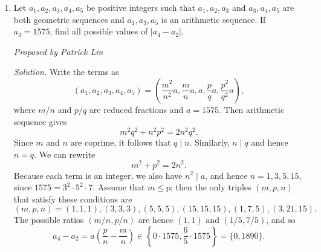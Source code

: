 \documentclass[10pt]{article}
\newcommand{\proposed}[1]
{
\vspace{5pt}
\noindent\textit{Proposed by #1}
}
\newcommand{\solution}
{
\vspace{5pt}
\noindent\textit{Solution.}\qquad
}
\begin{document}
\begin{enumerate}
	\proposed{David Altizio}
	
	\solution Note that since the sum of the three multiplicands is $(a+b)+(b+c)+(c+a) = 2(a+b+c)$, we know that at least one of $a+b$, $b+c$, or $c+a$ is even.  Thus the product is always divisible by $2$.  In order for the product to not be divisible by $4$, it must be the case that two of these quantities are odd and the third one is congruent to $2$ modulo $4$.

\par WLOG suppose that $a+b$ and $a+c$ are odd and $b+c\equiv 2\pmod 4$.  Since $(a+b)-(a+c) = b-c$ is even, it follows that $b$ and $c$ are of the same parity.  We now split into cases based on whether both are even or both are odd.

\begin{itemize}

\item If both are even, then they cannot both be congruent modulo $4$, or else their sum would be divisible by $4$.  It follows that $b$ and $c$ must be $4$ and $2$ in some order.  Then $a$ can be $1$, $3$, or $5$; this gives a total of $2\times 3 = 6$ possibilities in this case.

\item If both are odd, then they both must be congruent modulo $4$, or else their sum would be $1+3\equiv 0\pmod 4$.  This means they must be both either $1\pmod 4$ or $3\pmod 4$.  Then $a$ can be either $2$ or $4$, so there are a total of $2\times (2^2+1) = 10$ possibilities in this case.

\end{itemize}

Multiplying by $3$ from our WLOG above gives the final answer as $3(6+10) = \boxed{48}$.

\item Let $a_1, a_2, a_3, a_4, a_5$ be positive integers such that $a_1, a_2, a_3$ and $a_3, a_4, a_5$ are both geometric sequences and $a_1, a_3, a_5$ is an arithmetic sequence. If $a_3 = 1575$, find all possible values of $\vert a_4 - a_2 \vert$.

\proposed{Patrick Lin}

\solution Write the terms as
\[(a_1, a_2, a_3, a_4, a_5) = \left(\frac{m^2}{n^2}a, \frac{m}{n}a, a, \frac{p}{q}a, \frac{p^2}{q^2}a\right),\]
where $m/n$ and $p/q$ are reduced fractions and $a = 1575$. Then arithmetic sequence gives
\[m^2 q^2 + n^2 p^2 = 2n^2q^2.\]
Since $m$ and $n$ are coprime, it follows that $q \mid n$. Similarly, $n \mid q$ and hence $n = q$. We can rewrite
\[m^2 + p^2 = 2n^2.\]
Because each term is an integer, we also have $n^2 \mid a$, and hence $n = 1, 3, 5, 15$, since $1575 = 3^2\cdot 5^2\cdot 7$. Assume that $m\le p$; then the only triples $(m,p,n)$ that satisfy these conditions are 
\[(m,p,n) = (1,1,1),(3,3,3),(5,5,5),(15,15,15),(1,7,5),(3,21,15).\]
The possible ratios $(m/n, p/n)$ are hence $(1,1)$ and $(1/5, 7/5)$, and so \[a_4 - a_2 = a\left(\dfrac pn - \dfrac mn\right)\in\left\{0\cdot 1575, \frac65\cdot 1575\right\} = \boxed{\{0, 1890\}}.\] 


\end{enumerate}
\end{document}
